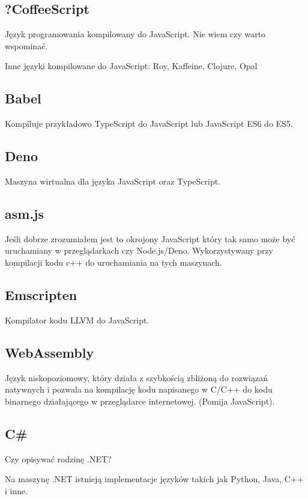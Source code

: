 \subsection{?CoffeeScript}
Język programowania kompilowany do JavaScript.
Nie wiem czy warto wspominać.

Inne języki kompilowane do JavaScript: Roy, Kaffeine, Clojure, Opal

\subsection{Babel}
Kompiluje przykładowo TypeScript do JavaScript lub JavaScript ES6 do ES5.

\subsection{Deno}
Maszyna wirtualna dla języka JavaScript oraz TypeScript.

\subsection{asm.js}
Jeśli dobrze zrozumiałem jest to okrojony JavaScript który tak samo może być uruchamiany w przeglądarkach czy Node.js/Deno.
Wykorzystywany przy kompilacji kodu c++ do uruchamiania na tych maszynach.

\subsection{Emscripten}
Kompilator kodu LLVM do JavaScript.

\subsection{WebAssembly}
Język niskopoziomowy, który działa z szybkością zbliżoną do rozwiązań natywnych i pozwala na kompilację kodu napisanego w C/C++ do kodu binarnego działającego w przeglądarce internetowej.
(Pomija JavaScript).

\subsection{C\#}
Czy opisywać rodzinę .NET?

Na maszynę .NET istnieją implementacje języków takich jak Python, Java, C++ i inne.

